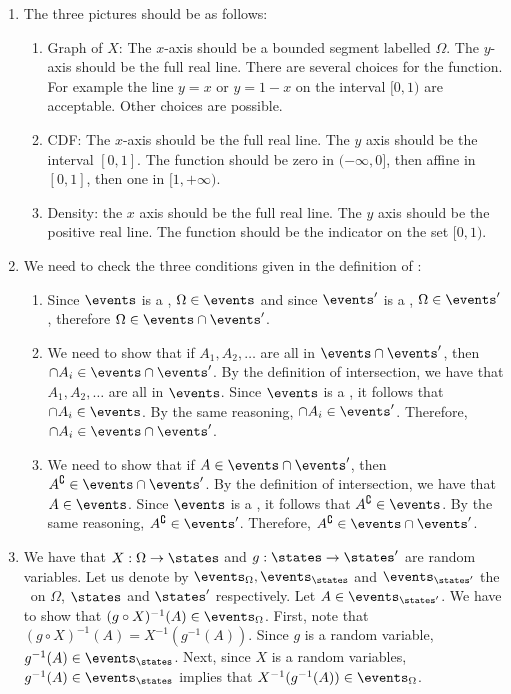 \documentclass{article}
\begin{document}
\begin{enumerate}
  \item The three pictures should be as follows:
  \begin{enumerate}
    \item Graph of $X$: The $x$-axis should be a bounded segment labelled $\Omega$. The $y$-axis should be the full real line. There are several choices for the function. For example the line $y = x$ or $y = 1 - x$ on the interval $[0, 1)$ are acceptable. Other choices are possible.
    \item CDF: The $x$-axis should be the full real line. The $y$ axis should be the interval $[0, 1]$. The function should be zero in $(-\infty, 0]$, then affine in $[0, 1]$, then one in $[1, +\infty)$.
    \item Density: the $x$ axis should be the full real line. The $y$ axis should be the positive real line. The function should be the indicator on the set $[0, 1)$.
  \end{enumerate}
  \item We need to check the three conditions given in the definition of \sigmaalg:
  \begin{enumerate}
    \item Since $\events$ is a \sigmaalg, $\Omega \in \events$ and since $\events'$ is a \sigmaalg, $\Omega \in \events'$, therefore $\Omega \in \events \cap \events'$.
    \item We need to show that if $A_1, A_2, \dots$ are all in $\events \cap \events'$, then $\cap A_i \in \events \cap \events'$. By the definition of intersection, we have that $A_1, A_2, \dots$ are all in $\events$. Since $\events$ is a \sigmaalg, it follows that $\cap A_i \in \events$. By the same reasoning, $\cap A_i \in \events'$. Therefore, $\cap A_i \in \events \cap \events'$.
    \item We need to show that if $A \in \events \cap \events'$, then $A^\complement \in \events \cap \events'$. By the definition of intersection, we have that $A \in \events$. Since $\events$ is a \sigmaalg, it follows that $A^\complement \in \events$. By the same reasoning, $A^\complement \in \events'$. Therefore, $A^\complement \in \events \cap \events'$.
  \end{enumerate}
  \item We have that $X: \Omega \to \states$ and $g : \states \to \states'$ are random variables. Let us denote by $\events_\Omega, \events_{\states}$ and $\events_{\states'}$ the \sigmaalg\ on $\Omega$, $\states$ and $\states'$ respectively. Let $A \in \events_{\states'}$. We have to show that $(g \circ X)^{-1}(A) \in \events_\Omega$. First, note that $(g \circ X)^{-1}(A) = X^{-1}(g^{-1}(A))$. Since $g$ is a random variable, $g^{-1}(A) \in \events_\states$. Next, since $X$ is a random variables, $g^{-1}(A) \in \events_\states$ implies that $X^{-1}(g^{-1}(A)) \in \events_\Omega$.

\end{enumerate}
\end{document}
